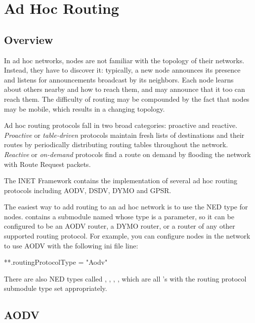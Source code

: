 \chapter{Ad Hoc Routing}
\label{cha:adhoc-routing}

\section{Overview}
\label{sec:adhocrouting:overview}

In ad hoc networks, nodes are not familiar with the topology of
their networks. Instead, they have to discover it: typically,
a new node announces its presence and listens for announcements
broadcast by its neighbors. Each node learns about others nearby
and how to reach them, and may announce that it too can reach them.
The difficulty of routing may be compounded by the fact that
nodes may be mobile, which results in a changing topology.

Ad hoc routing protocols fall in two broad categories: proactive
and reactive. \textit{Proactive} or \textit{table-driven} protocols
maintain fresh lists of destinations and their routes by periodically
distributing routing tables throughout the network.
\textit{Reactive} or \textit{on-demand} protocols find a route on demand
by flooding the network with Route Request packets.

The INET Framework contains the implementation of several ad hoc routing
protocols including AODV, DSDV, DYMO and GPSR.

The easiest way to add routing to an ad hoc network is to use the
 NED type for nodes. 
contains a submodule named  whose type is a parameter,
so it can be configured to be an AODV router, a DYMO router, or a
router of any other supported routing protocol. For example, you
can configure  nodes in the network to use
AODV with the following ini file line:

\begin{inifile}
**.routingProtocolType = "Aodv"
\end{inifile}

There are also NED types called , ,
, , which are all
's with the routing protocol submodule type
set appropriately.


\section{AODV}
\label{sec:adhocrouting:aodv}

